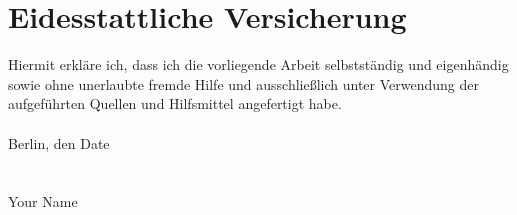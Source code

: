 \section*{Eidesstattliche Versicherung}
Hiermit erkläre ich, dass ich die vorliegende Arbeit selbstständig und eigenhändig sowie ohne 
unerlaubte fremde Hilfe und ausschließlich unter Verwendung der aufgeführten Quellen und Hilfsmittel 
angefertigt habe.\\
\\
Berlin, den Date\\
\vspace{1cm}\\
\underline{\hspace{5cm}}\\
Your Name